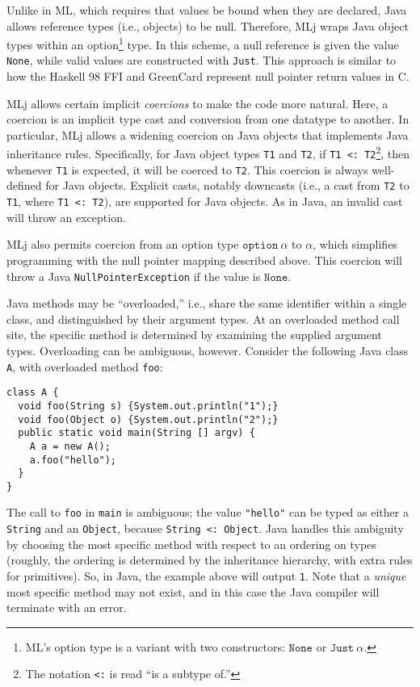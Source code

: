 Unlike in ML, which requires that values be bound when they are declared, Java allows reference types (i.e., objects) to be null. Therefore, MLj wraps Java object types within an option\footnote{ML's option type is a variant with two constructors: $\mathtt{None}$ or $\mathtt{Just}~\alpha$.} type. In this scheme, a null reference is given the value \texttt{None}, while valid values are constructed with \texttt{Just}. This approach is similar to how the Haskell 98 FFI and GreenCard represent null pointer return values in C.

MLj allows certain implicit \emph{coercions} to make the code more natural. Here, a coercion is an implicit type cast and conversion from one datatype to another. In particular, MLj allows a widening coercion on Java objects that implements Java inheritance rules. Specifically, for Java object types \texttt{T1} and \texttt{T2}, if \texttt{T1 <: T2}\footnote{The notation \texttt{<:} is read ``is a subtype of.''}, then whenever \texttt{T1} is expected, it will be coerced to \texttt{T2}. This coercion is always well-defined for Java objects. Explicit casts, notably downcasts (i.e., a cast from \texttt{T2} to \texttt{T1}, where \texttt{T1 <: T2}), are supported for Java objects. As in Java, an invalid cast will throw an exception.

MLj also permits coercion from an option type $\mathtt{option}~\alpha$ to $\alpha$, which simplifies programming with the null pointer mapping described above. This coercion will throw a Java \texttt{NullPointerException} if the value is $\mathtt{None}$.

Java methods may be ``overloaded,'' i.e., share the same identifier within a single class, and distinguished by their argument types. At an overloaded method call site, the specific method is determined by examining the supplied argument types. Overloading can be ambiguous, however. Consider the following Java class \texttt{A}, with overloaded method \texttt{foo}:

\begin{verbatim}
class A {
  void foo(String s) {System.out.println("1");}
  void foo(Object o) {System.out.println("2");}
  public static void main(String [] argv) {
    A a = new A();
    a.foo("hello");
  }
}
\end{verbatim}

The call to \texttt{foo} in \texttt{main} is ambiguous; the value \texttt{"hello"} can be typed as either a \texttt{String} and an \texttt{Object}, because \texttt{String <: Object}. Java handles this ambiguity by choosing the most specific method with respect to an ordering on types (roughly, the ordering is determined by the inheritance hierarchy, with extra rules for primitives). So, in Java, the example above will output \texttt{1}. Note that a \emph{unique} most specific method may not exist, and in this case the Java compiler will terminate with an error.

